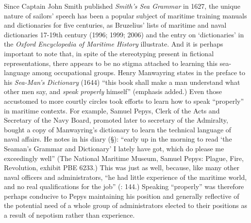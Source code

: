 Since Captain John Smith published \textit{Smith’s Sea Grammar} in 1627, the unique nature of sailors’ speech has been a popular subject of maritime training manuals and dictionaries for five centuries, as Bruzelius’ lists of maritime and naval dictionaries 17-19th century (1996; 1999; 2006) and the entry on ‘dictionaries’ in the \textit{Oxford Encyclopedia of Maritime History} \citep{Hattendorf2007} illustrate. And it is perhaps important to note that, in spite of the stereotyping present in fictional representations, there appears to be no stigma attached to learning this sea-language among occupational groups. Henry Manwayring states in the preface to his \textit{Sea-Man’s Dictionary} (1644) “this book shall make a man understand what other men say, and \textit{speak properly} himself” (emphasis added.) Even those accustomed to more courtly circles took efforts to learn how to speak “properly” in maritime contexts. For example, Samuel Pepys, Clerk of the Acts and Secretary of the Navy Board, promoted later to secretary of the Admiralty, bought a copy of Manwayring’s dictionary to learn the technical language of naval affairs. He notes in his diary (§\citealt{March1661}): “early up in the morning to read ‘the Seaman’s Grammar and Dictionary’ I lately have got, which do please me exceedingly well” (The National Maritime Museum, Samuel Pepys: Plague, Fire, Revolution, exhibit PBE 6233.)  This was just as well, because, like many other naval officers and administrators, “he had little experience of the maritime world, and no real qualifications for the job” (\citealt{Lincoln2015}: 144.) Speaking “properly” was therefore perhaps conducive to Pepys maintaining his position and generally reflective of the potential need of a whole group of administrators elected to their positions as a result of nepotism rather than experience. 


